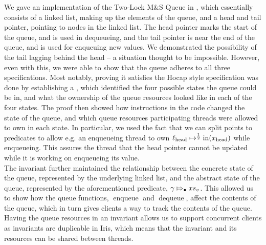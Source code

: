 \documentclass[a4paper, 10pt]{report}
\theoremstyle{definition}
\newcommand{\enqueue}{\operatorname{enqueue}}
\newcommand{\dequeue}{\operatorname{dequeue}}
\newcommand{\msq}{M\&S Queue}
\newcommand{\tlmsq}{Two-Lock \msq{}}
\newcommand{\locN}[1]{\loc_{\mathrm{#1}}}
\newcommand{\lochead}{\locN{head}}
\newcommand{\nIn}[1]{\operatorname{in}(#1)}
\newcommand{\node}{x}
\newcommand{\nodeN}[1]{\node_{\mathrm{#1}}}
\newcommand{\nodehead}{\nodeN{head}}
\newcommand{\absvalueList}{xs_v}
\newcommand{\abstractstateauth}[2]{#1 \Mapsto_{\bullet} #2}
\begin{document}
We gave an implementation of the \tlmsq{} in \heaplang{}, which essentially consists of a linked list, making up the elements of the queue, and a head and tail pointer, pointing to nodes in the linked list. The head pointer marks the start of the queue, and is used in dequeueing, and the tail pointer is near the end of the queue, and is used for enqueuing new values. We demonstrated the possibility of the tail lagging behind the head -- a situation thought to be impossible. However, even with this, we were able to show that the queue adheres to all three specifications. Most notably, proving it satisfies the Hocap style specification was done by establishing a , which identified the four possible states the queue could be in, and what the ownership of the queue resources looked like in each of the four states. The proof then showed how instructions in the code changed the state of the queue, and which queue resources participating threads were allowed to own in each state. In particular, we used the fact that we can split points to predicates to allow e.g. an enqueueing thread to own $\lochead \mapsto^{\frac{1}{2}} \nIn{\nodehead}$ while enqueueing. This assures the thread that the head pointer cannot be updated while it is working on enqueueing its value.\\
The invariant further maintained the relationship between the concrete state of the queue, represented by the underlying linked list, and the abstract state of the queue, represented by the aforementioned predicate, $\abstractstateauth{\gname}{\absvalueList}$. This allowed us to show how the queue functions, $\enqueue$ and $\dequeue$, affect the contents of the queue, which in turn gives clients a way to track the contents of the queue.\\
Having the queue resources in an invariant allows us to support concurrent clients as invariants are duplicable in Iris, which means that the invariant and its resources can be shared between threads.
\end{document}

